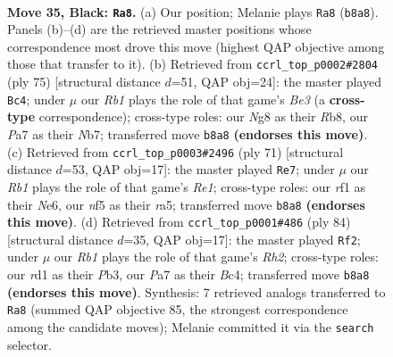 \documentclass[11pt]{article}
\begin{document}
\clearpage

\begin{figure}[p]\centering
\begin{subfigure}{0.46\textwidth}\centering
\resizebox{\linewidth}{!}{%
\newchessgame
\chessboard[
  setfen={1rk3nb/p6p/P1p2p2/2P2N2/1r2P3/6B1/8/3R1RK1 b - - 1 35},
  showmover=false,
  pgfstyle=straightmove, color=movearrow, markmove={b8-a8}
]}
\caption{}
\end{subfigure}\hfill
\begin{subfigure}{0.46\textwidth}\centering
\resizebox{\linewidth}{!}{%
\newchessgame
\chessboard[
  setfen={1r4r1/1n3k1p/3pbp1P/8/p3PN2/P1P5/2B5/2KR1R2 b - - 0 38},
  showmover=false,
  pgfstyle=straightmove, color=movearrow, markmove={e6-c4}
]}
\caption{}
\end{subfigure}
\\[4pt]
\begin{subfigure}{0.46\textwidth}\centering
\resizebox{\linewidth}{!}{%
\newchessgame
\chessboard[
  setfen={4r1k1/6p1/4n2p/RB1bNp2/3r4/6PP/5P2/R5K1 b - - 4 36},
  showmover=false,
  pgfstyle=straightmove, color=movearrow, markmove={e8-e7}
]}
\caption{}
\end{subfigure}\hfill
\begin{subfigure}{0.46\textwidth}\centering
\resizebox{\linewidth}{!}{%
\newchessgame
\chessboard[
  setfen={3r2k1/3r1p2/6n1/p1p1bNP1/P1B5/1P3p2/2K4R/7R w - - 1 43},
  showmover=false,
  pgfstyle=straightmove, color=movearrow, markmove={h2-f2}
]}
\caption{}
\end{subfigure}
\caption{\textbf{Move 35, Black: \texttt{Ra8}.} (a) Our position; Melanie plays \texttt{Ra8} (\texttt{b8a8}). Panels (b)--(d) are the retrieved master positions whose correspondence most drove this move (highest QAP objective among those that transfer to it). (b) Retrieved from \texttt{ccrl\_top\_p0002\#2804} (ply 75) [structural distance $d$=51, QAP obj=24]: the master played \texttt{Bc4}; under $\mu$ our \emph{Rb1} plays the role of that game's \emph{Be3} (a \textbf{cross-type} correspondence); cross-type roles: our \emph{N}g8 as their \emph{R}b8, our \emph{P}a7 as their \emph{N}b7; transferred move \texttt{b8a8} \textbf{(endorses this move)}. (c) Retrieved from \texttt{ccrl\_top\_p0003\#2496} (ply 71) [structural distance $d$=53, QAP obj=17]: the master played \texttt{Re7}; under $\mu$ our \emph{Rb1} plays the role of that game's \emph{Re1}; cross-type roles: our \emph{r}f1 as their \emph{N}e6, our \emph{n}f5 as their \emph{r}a5; transferred move \texttt{b8a8} \textbf{(endorses this move)}. (d) Retrieved from \texttt{ccrl\_top\_p0001\#486} (ply 84) [structural distance $d$=35, QAP obj=17]: the master played \texttt{Rf2}; under $\mu$ our \emph{Rb1} plays the role of that game's \emph{Rh2}; cross-type roles: our \emph{r}d1 as their \emph{P}b3, our \emph{P}a7 as their \emph{B}c4; transferred move \texttt{b8a8} \textbf{(endorses this move)}. Synthesis: 7 retrieved analogs transferred to \texttt{Ra8} (summed QAP objective 85, the strongest correspondence among the candidate moves); Melanie committed it via the \texttt{search} selector.}
\label{fig:thought-m69}
\end{figure}
\end{document}
